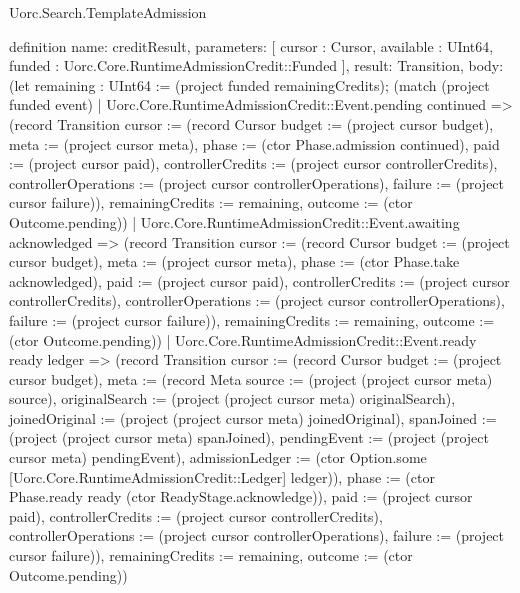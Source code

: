 \begin{lexlean}{Uorc.Search.TemplateAdmission}
\begin{semanticmodule}
definition{
  name: creditResult,
  parameters: [
    cursor : Cursor,
    available : UInt64,
    funded : Uorc.Core.RuntimeAdmissionCredit::Funded
  ],
  result: Transition,
  body: (let remaining : UInt64 := (project funded remainingCredits); (match (project funded event)
    | Uorc.Core.RuntimeAdmissionCredit::Event.pending continued => (record Transition {cursor := (record Cursor {budget := (project cursor budget), meta := (project cursor meta), phase := (ctor Phase.admission continued), paid := (project cursor paid), controllerCredits := (project cursor controllerCredits), controllerOperations := (project cursor controllerOperations), failure := (project cursor failure)}), remainingCredits := remaining, outcome := (ctor Outcome.pending)})
    | Uorc.Core.RuntimeAdmissionCredit::Event.awaiting acknowledged => (record Transition {cursor := (record Cursor {budget := (project cursor budget), meta := (project cursor meta), phase := (ctor Phase.take acknowledged), paid := (project cursor paid), controllerCredits := (project cursor controllerCredits), controllerOperations := (project cursor controllerOperations), failure := (project cursor failure)}), remainingCredits := remaining, outcome := (ctor Outcome.pending)})
    | Uorc.Core.RuntimeAdmissionCredit::Event.ready ready ledger => (record Transition {cursor := (record Cursor {budget := (project cursor budget), meta := (record Meta {source := (project (project cursor meta) source), originalSearch := (project (project cursor meta) originalSearch), joinedOriginal := (project (project cursor meta) joinedOriginal), spanJoined := (project (project cursor meta) spanJoined), pendingEvent := (project (project cursor meta) pendingEvent), admissionLedger := (ctor Option.some [Uorc.Core.RuntimeAdmissionCredit::Ledger] ledger)}), phase := (ctor Phase.ready ready (ctor ReadyStage.acknowledge)), paid := (project cursor paid), controllerCredits := (project cursor controllerCredits), controllerOperations := (project cursor controllerOperations), failure := (project cursor failure)}), remainingCredits := remaining, outcome := (ctor Outcome.pending)})
}
\end{semanticmodule}
\end{lexlean}
